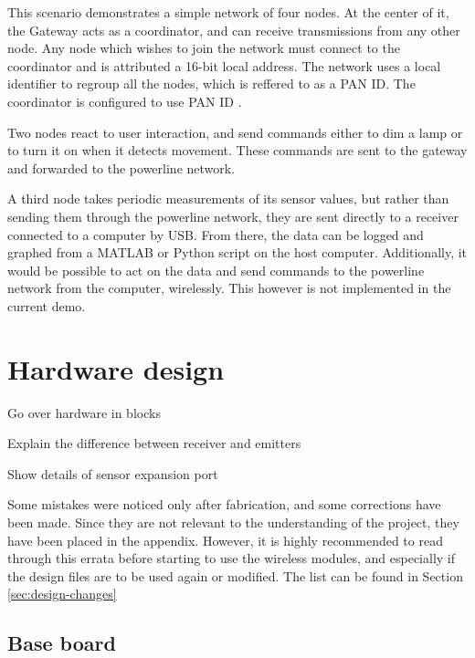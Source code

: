 This scenario demonstrates a simple network of four nodes. At the center of it,
the Gateway acts as a coordinator, and can receive transmissions from any other
node. Any node which wishes to join the network must connect to the coordinator
and is attributed a 16-bit local address. The network uses a local identifier to
regroup all the nodes, which is reffered to as a PAN ID. The coordinator is
configured to use PAN ID .

Two nodes react to user interaction, and send commands either to dim a lamp or
to turn it on when it detects movement. These commands are sent to the gateway
and forwarded to the powerline network.

A third node takes periodic measurements of its sensor values, but rather than
sending them through the powerline network, they are sent directly to a receiver
connected to a computer by USB. From there, the data can be logged and graphed
from a MATLAB or Python script on the host computer. Additionally, it would be
possible to act on the data and send commands to the powerline network from the
computer, wirelessly. This however is not implemented in the current demo.


\section{Hardware design}

Go over hardware in blocks

Explain the difference between receiver and emitters

Show details of sensor expansion port


Some mistakes were noticed only after fabrication, and some corrections have
been made. Since they are not relevant to the understanding of the project, they
have been placed in the appendix. However, it is highly recommended to read
through this errata before starting to use the wireless modules, and especially
if the design files are to be used again or modified. The list can be found in
Section \ref{sec:design-changes}

\subsection{Base board}


